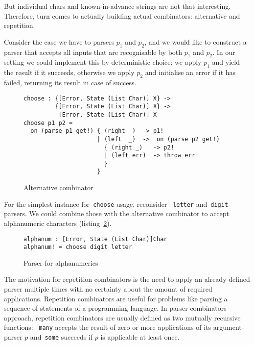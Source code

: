     But individual chars and known-in-advance strings are not that interesting. Therefore, turn comes to actually building actual combinators: alternative
    and repetition.

    Consider the case we have to parsers $p_1$ and $p_2$, and we would like to
    construct a parser that accepts all inputs that are recognisable by both
    $p_1$ and $p_2$. In our setting we could implement this by deterministic
    choice: we apply $p_1$ and yield the result if it succeeds, otherwise we
    apply $p_2$ and initialise an error if it has failed, returning its
    result in case of success.

    \begin{figure}[h]
    \begin{lstlisting}
choose : {[Error, State (List Char)] X} ->
         {[Error, State (List Char)] X} ->
          [Error, State (List Char)] X
choose p1 p2 =
  on (parse p1 get!) { (right _)  -> p1!
                     | (left  _)  ->  on (parse p2 get!)
                       { (right _)   -> p2!
                       | (left err)  -> throw err
                       }
                     }
    \end{lstlisting}
    \caption{Alternative combinator}
    \label{listing:parserChooseCombo}
    \end{figure}

    For the simplest instance for~\texttt{choose} usage, reconsider
    ~\texttt{letter} and~\texttt{digit} parsers. We could combine those with the
    alternative combinator to accept alphanumeric characters
    (listing~\ref{listing:parserAlphanumCombo}).

    \begin{figure}[h]
    \begin{lstlisting}
alphanum : [Error, State (List Char)]Char
alphanum! = choose digit letter
    \end{lstlisting}
    \caption{Parser for alphanumerics}
    \label{listing:parserAlphanumCombo}
    \end{figure}

    The motivation for repetition combinators is the need to apply an already defined
    parser multiple times with no certainty about the amount of required applications.
    Repetition combinators are useful for problems like parsing a sequence
    of statements of a programming language. In parser combinators approach,
    repetition combinators are usually defined as two mutually recursive functions:
    ~\texttt{many} accepts the result of zero or more applications of its
    argument-parser $p$ and~\texttt{some} succeeds if $p$ is applicable at least
    once.

